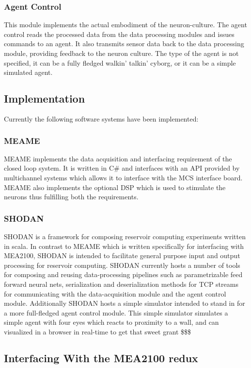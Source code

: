 \subsubsection{Agent Control}
This module implements the actual embodiment of the neuron-culture. The agent
control reads the processed data from the data processing modules and issues
commands to an agent. It also transmits sensor data back to the data processing
module, providing feedback to the neuron culture.
The type of the agent is not specified, it can be a fully fledged walkin'
talkin' cyborg, or it can be a simple simulated agent.
\subsection{Implementation} 
Currently the following software systems have been implemented:
\subsubsection{MEAME}
MEAME implements the data acquisition and interfacing requirement of the closed
loop system. It is written in C\# and interfaces with an API provided by
multichannel systems which allows it to interface with the MCS interface board.
MEAME also implements the optional DSP which is used to stimulate the neurons
thus fulfilling both the requirements.
\subsubsection{SHODAN}
SHODAN is a framework for composing reservoir computing experiments written in
scala. In contrast to MEAME which is written specifically for interfacing with
MEA2100, SHODAN is intended to facilitate general purpose input and output
processing for reservoir computing.
SHODAN currently hosts a number of tools for composing and reusing
data-processing pipelines such as parametrizable feed forward neural nets,
serialization and deserialization methods for TCP streams for communicating with
the data-acquisition module and the agent control module.
Additionally SHODAN hosts a simple simulator intended to stand in for a more
full-fledged agent control module. This simple simulator simulates a simple
agent with four eyes which reacts to proximity to a wall, and can visualized in
a browser in real-time to get that sweet grant \$\$\$
\subsection{Interfacing With the MEA2100 redux}

